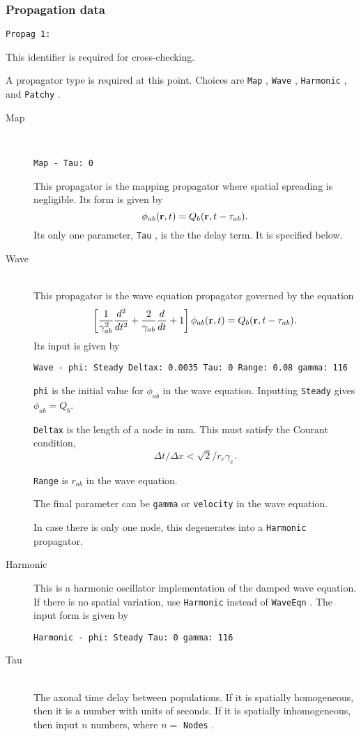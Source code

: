 \documentclass[12pt,a4paper]{article}
\newcommand{\type}[1]{ {\small\small\tt #1} }
\begin{document}
\subsubsection{Propagation data}
\label{sec:prop}
\item
	\begin{lstlisting}
Propag 1:
	\end{lstlisting}
	This identifier is required for cross-checking.
\item A propagator type is required at this point. Choices are \type{Map}, \type{Wave}, \type{Harmonic}, and \type{Patchy}.
\begin{description}
	\item[Map]\ \\
	\begin{lstlisting}
Map - Tau: 0
	\end{lstlisting}
	This propagator is the mapping propagator where spatial spreading is negligible. Its form is given by
	\[\phi_{ab}({\bf r}, t) = Q_b ({\bf r}, t - \tau_{ab}).\]
	Its only one parameter, \type{Tau}, is the the delay term. It is specified below.

	\item[Wave]\ \\
	This propagator is the wave equation propagator governed by the equation
	\[\left[\frac{1}{\gamma_{ab}^2}\frac{d^2}{d t^2}+\frac{2}{\gamma_{ab}}\frac{d} {d t}+1 \right] \phi_{ab}({\bf r},t) =Q_b({\bf r},t-\tau_{ab}).\]
	Its input is given by
	\begin{lstlisting}
Wave - phi: Steady Deltax: 0.0035 Tau: 0 Range: 0.08 gamma: 116
	\end{lstlisting}
	\type{phi} is the initial value for $\phi_{ab}$ in the wave equation. Inputting \type{Steady} gives \(\phi_{ab} = Q_b\).

	\type{Deltax} is the length of a node in mm. This must satisfy the Courant condition, \[\Delta t/\Delta x<\sqrt{2}/r_e\gamma_e.\]

	\type{Range} is $r_{ab}$ in the wave equation.
	
	The final parameter can be \type{gamma} or \type{velocity} in the wave equation.

	In case there is only one node, this degenerates into a \type{Harmonic} propagator.

	\item[Harmonic]
	This is a harmonic oscillator implementation of the damped wave equation. If there is no spatial variation, use \type{Harmonic} instead of \type{WaveEqn}.
	The input form is given by 
	\begin{lstlisting}
Harmonic - phi: Steady Tau: 0 gamma: 116
	\end{lstlisting}

	\item[Tau]\ \\
	The axonal time delay between populations. If it is spatially homogeneous, then it is a number with units of seconds. If it is spatially inhomogeneous, then input \(n\) numbers, where \(n=\) \type{Nodes}.

\end{description}
\end{document}
